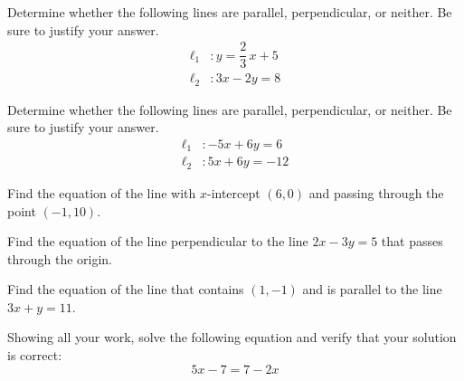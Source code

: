 \documentclass[11pt,letterpaper]{article}
\begin{document}

 Determine whether the following lines are parallel, perpendicular, or neither. Be sure to justify your answer. \pvspace{0.1cm}
	\[
	\begin{aligned}
	\ell_1 &\colon y= \dfrac{2}{3}\,x + 5 \\[0.3cm]
	\ell_2 &\colon 3x - 2y= 8
	\end{aligned}
	\]



\newpage



 Determine whether the following lines are parallel, perpendicular, or neither. Be sure to justify your answer. \pvspace{0.1cm}
	\[
	\begin{aligned}
	\ell_1 &\colon -5x + 6y= 6 \\[0.3cm]
	\ell_2 &\colon 5x + 6y= -12
	\end{aligned}
	\]



\newpage



 Find the equation of the line with $x$-intercept $(6, 0)$ and passing through the point $(-1, 10)$. 



\newpage



 Find the equation of the line perpendicular to the line $2x - 3y= 5$ that passes through the origin. 



\newpage



 Find the equation of the line that contains $(1, -1)$ and is parallel to the line $3x + y= 11$. 



\newpage



 Showing all your work, solve the following equation and verify that your solution is correct:
	\[
	5x - 7= 7 - 2x
	\]



\newpage
\end{document}
